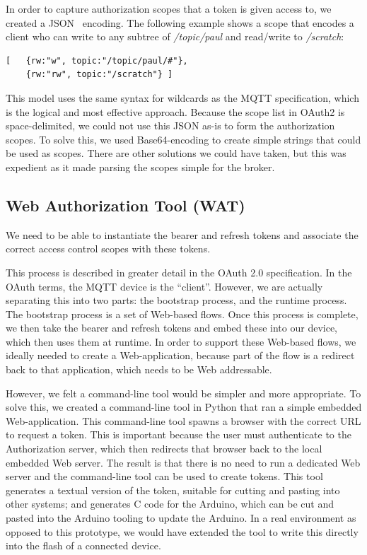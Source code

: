 \documentclass{IEEEtran}
\begin{document}
In order to capture authorization scopes that a token is given access to, we created a JSON~\cite{json} encoding. The following example shows a scope that encodes a client who can 
write to any subtree of \emph{/topic/paul} and read/write to \emph{/scratch}:
\begin{verbatim}
[   {rw:"w", topic:"/topic/paul/#"},  
    {rw:"rw", topic:"/scratch"} ]
\end{verbatim}
This model uses the same syntax for wildcards as the MQTT specification, which is the logical 
and most effective approach. Because the scope list in OAuth2 is space-delimited, we could not use this JSON as-is to form the authorization scopes. To solve this, we used Base64-encoding to create simple strings that could be used as scopes. There are other solutions we could have taken, but this was expedient as it made parsing the scopes simple for the broker.

\subsection{Web Authorization Tool (WAT)}
We need to be able 
to instantiate the bearer and refresh tokens and associate the correct access control scopes with these tokens. 

This process is described in greater detail in the OAuth 2.0 
specification. In the OAuth terms, the MQTT device is the ``client''. However, we are actually
separating this into two parts: the bootstrap process, and the runtime process. The bootstrap process is a set of Web-based flows. Once this
process is complete, we then take the bearer and refresh tokens and embed these into our device, which then uses them at runtime.
In order to support these Web-based flows, we ideally needed to create a Web-application, because
part of the flow is a redirect back to that application, which needs to be Web addressable. 

However, we felt a command-line tool would be simpler and more appropriate.
To solve this, we created a command-line tool in Python that ran a simple embedded Web-application. 
This command-line tool spawns a browser with the correct URL to request a token. This is important because the user must authenticate to the Authorization server, which
then redirects that browser back to the local embedded Web server. The result is that there is no 
need to run a dedicated Web server and the command-line tool can be used to create tokens.
This tool generates a textual version of the token, suitable for cutting and pasting into other systems;
and  generates C code for the Arduino, which can be cut and pasted into the Arduino tooling to update the Arduino.
In a real environment as opposed to this prototype, we would have extended the tool to write this directly into the flash of a connected device.
\end{document}
